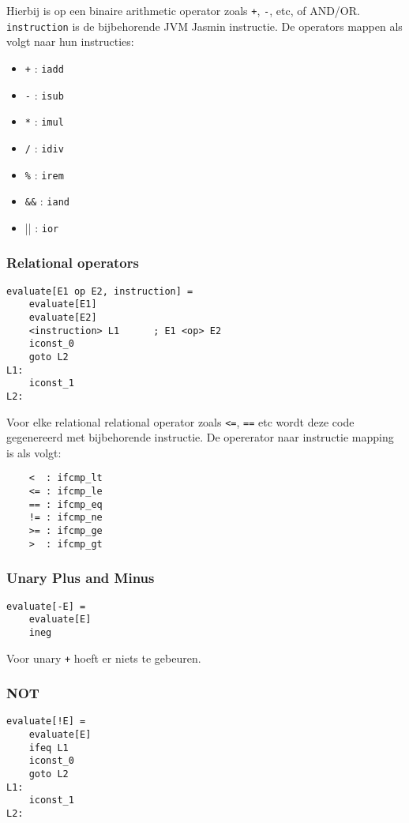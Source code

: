 \documentclass[]{article}
\begin{document}
Hierbij is op een binaire arithmetic operator zoals \texttt{+}, \texttt{-}, etc, of AND/OR. \texttt{instruction} is de bijbehorende JVM Jasmin instructie. De operators mappen als volgt naar hun instructies:

\begin{itemize}
	\item \texttt{+} : \texttt{iadd}
	\item \texttt{-} : \texttt{isub}
	\item \texttt{*} : \texttt{imul}
	\item \texttt{/} : \texttt{idiv}
	\item \texttt{\%} : \texttt{irem}
	
	\item \texttt{\&\&} : \texttt{iand}
	\item || : \texttt{ior}
\end{itemize}

\subsubsection{Relational operators}

\begin{verbatim}
evaluate[E1 op E2, instruction] =
    evaluate[E1]
    evaluate[E2]
    <instruction> L1	  ; E1 <op> E2
    iconst_0
    goto L2
L1:
    iconst_1
L2:
\end{verbatim}

Voor elke relational relational operator zoals \texttt{\textless=}, \texttt{==} etc wordt deze code gegenereerd met bijbehorende instructie. De opererator naar instructie mapping is als volgt:

\begin{verbatim}
	<  : ifcmp_lt
	<= : ifcmp_le
	== : ifcmp_eq
	!= : ifcmp_ne
	>= : ifcmp_ge
	>  : ifcmp_gt
\end{verbatim}

\subsubsection{Unary Plus and Minus}
\begin{verbatim}
evaluate[-E] =
    evaluate[E]
    ineg	
\end{verbatim}

Voor unary \texttt{+} hoeft er niets te gebeuren.

\subsubsection{NOT}
\begin{verbatim}
evaluate[!E] =
    evaluate[E]
    ifeq L1
    iconst_0
    goto L2
L1:
    iconst_1
L2:
\end{verbatim}
\end{document}
